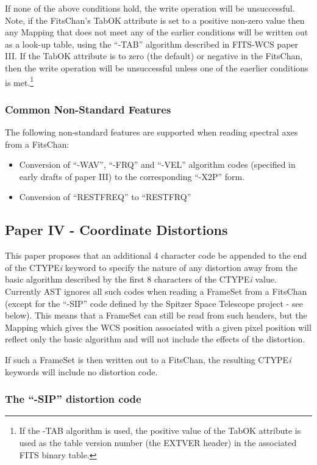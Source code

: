 \documentclass[twoside,11pt]{starlink}
\begin{document}
If none of the above conditions hold, the write operation will be
unsuccessful. Note, if the FitsChan's TabOK attribute is set to a positive
non-zero value then any Mapping that does not meet any of the earlier conditions
will be written out as a look-up table, using the ``-TAB'' algorithm described
in FITS-WCS paper III. If the TabOK attribute is to zero (the default) or
negative in the FitsChan, then the write operation will be unsuccessful unless
one of the eaerlier conditions is met.\footnote{If the -TAB algorithm is used, the
positive value of the TabOK attribute is used as the table version number
(the EXTVER header) in the associated FITS binary table.}

\subsubsection{Common Non-Standard Features}
The following non-standard features are supported when reading spectral
axes from a FitsChan:

\begin{itemize}
\item Conversion of ``-WAV'', ``-FRQ'' and ``-VEL'' algorithm codes
(specified in early drafts of paper III) to the corresponding
``-X2P'' form.
\item Conversion of ``RESTFREQ'' to ``RESTFRQ''
\end{itemize}

\subsection{Paper IV - Coordinate Distortions}

This paper proposes that an additional 4 character code be appended to
the end of the CTYPE\emph{i} keyword to specify the nature of any
distortion away from the basic algorithm described by the first 8
characters of the CTYPE\emph{i} value. Currently AST ignores all such
codes when reading a FrameSet from a FitsChan (except for the ``-SIP'' code
defined by the Spitzer Space Telescope project - see below). This means that
a FrameSet can still be read from such headers, but the Mapping which gives
the WCS position associated with a given pixel position will reflect only
the basic algorithm and will not include the effects of the distortion.

If such a FrameSet is then written out to a FitsChan, the resulting
CTYPE\emph{i} keywords will include no distortion code.

\subsubsection{The ``-SIP'' distortion code}
\end{document}
